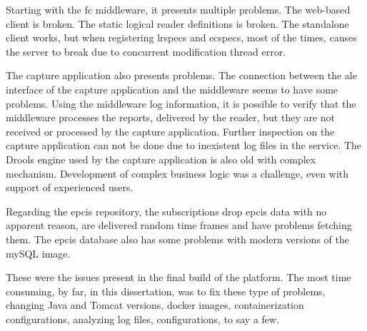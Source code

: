 Starting with the \ac{fc} middleware, it presents multiple problems. 
The web-based client is broken. The static logical reader definitions is broken.
The standalone client works, but when registering \acp{lrspec} and \acp{ecspec}, most of the times, causes the server to break due to concurrent modification thread error. 

The capture application also presents problems.
The connection between the \ac{ale} interface of the capture application and the middleware seems to have some problems. Using the middleware log information, it is possible to verify that the middleware processes the reports, delivered by the reader, but they are not received or processed by the capture application.
Further inspection on the capture application can not be done due to inexistent log files in the service.
The Drools engine used by the capture application is also old with complex mechanism. Development of complex business logic was a challenge, even with support of experienced users.

Regarding the \ac{epcis} repository, the subscriptions drop \ac{epcis} data with no apparent reason, are delivered random time frames and have problems fetching them. The \ac{epcis} database also has some problems with modern versions of the mySQL image.

These were the issues present in the final build of the platform. The most time consuming, by far, in this dissertation, was to fix these type of problems, changing Java and Tomcat versions, docker images, containerization configurations, analyzing log files, configurations, to say a few.
